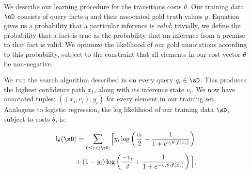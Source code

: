 We describe our learning procedure for the transitions costs $\theta$.
Our training data $\sD$ consists of query facts $q$ and their associated
  gold truth values $y$.
Equation  gives us a probability that a particular inference
  is \textit{valid}; trivially, we define the probability that a
  fact is true as the probability that an inference from a premise to
  that fact is valid.
We optimize the likelihood of our gold annotations according to
  this probability, subject to
  the constraint that all elements in our cost vector $\theta$ be
  non-negative.

We run the search algorithm described in  on every
  query $q_i \in \sD$.
This produces the highest confidence path $x_1$, along with its
  inference state $v_i$.
We now have annotated tuples: $( (x_i, v_i), y_i )$ for every
  element in our training set.
Analogous to logistic regression, the log likelihood of our training
  data $\sD$, subject to costs $\theta$, is:

%

\vspace{-0.75em}
\begin{align*}
\l_\theta(\sD&) = \sum_{0 \leq i < |\sD|} \Big[
    y_i \log \left(\frac{v_i}{2} + \frac{1}{1 + e^{v_i \theta \cdot f(x_i)}} \right) \\
    &+ (1 - y_i) \log \left(\frac{-v_i}{2} + \frac{1}{1 + e^{-v_i \theta \cdot f(x_i)}} \right)
  \Big],
\end{align*}
\vspace{-1.0em}

